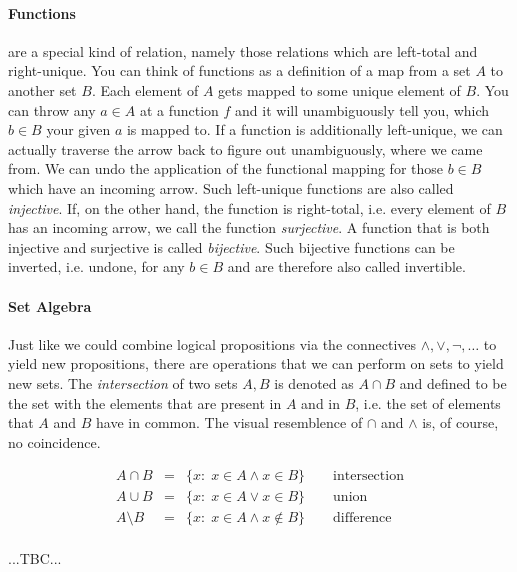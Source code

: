 \paragraph{Functions} are a special kind of relation, namely those relations which are left-total and right-unique. You can think of functions as a definition of a map from a set $A$ to another set $B$. Each element of $A$ gets mapped to some unique element of $B$. You can throw any $a \in A$ at a function $f$ and it will unambiguously tell you, which $b \in B$ your given $a$ is mapped to. If a function is additionally left-unique, we can actually traverse the arrow back to figure out unambiguously, where we came from. We can undo the application of the functional mapping for those $b \in B$ which have an incoming arrow. Such left-unique functions are also called \emph{injective}. If, on the other hand, the function is right-total, i.e. every element of $B$ has an incoming arrow, we call the function \emph{surjective}. A function that is both injective and surjective is called \emph{bijective}. Such bijective functions can be inverted, i.e. undone, for any $b \in B$ and are therefore also called invertible.

\paragraph{Set Algebra} Just like we could combine logical propositions via the connectives $\wedge, \vee, \neg, \ldots$ to yield new propositions, there are operations that we can perform on sets to yield new sets. The \emph{intersection} of two sets $A, B$ is denoted as $A \cap B$ and defined to be the set with the elements that are present in $A$ and in $B$, i.e. the set of elements that $A$ and $B$ have in common. The visual resemblence of $\cap$ and $\wedge$ is, of course, no coincidence.

\begin{eqnarray}
 A \cap B      &=& \{x: \; x \in A \wedge x \in    B \} \qquad \text{intersection} \\
 A \cup B      &=& \{x: \; x \in A \vee   x \in    B \} \qquad \text{union} \\
 A \setminus B &=& \{x: \; x \in A \wedge x \notin B \} \qquad \text{difference} \\
\end{eqnarray}

...TBC...



